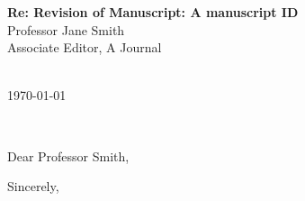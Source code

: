 \documentclass[12pt,letterpaper]{letter} %
\def\opening#1{\thispagestyle{empty}
{\centering\fromaddress \vspace{0.75in} \\ %
\hspace*{\shortindentation}\today\hspace*{\fill}\par} %
{\raggedright \toname \\ \toaddress \par} %
\vspace{0.4in} %
\noindent #1 %
}
\begin{document}

\begin{letter}
{
\Large\textbf{Re: Revision of Manuscript: A manuscript ID}\\
\vskip 0.1in
\normalsize Professor Jane Smith\\
Associate Editor, A Journal
}
\opening{Dear Professor Smith,}



\closing{Sincerely,}


\end{letter}
\end{document}

